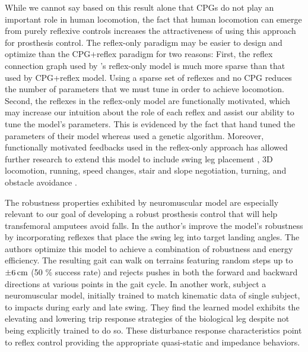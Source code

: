 While we cannot say based on this result alone that CPGs do not play an
important role in human locomotion, the fact that human locomotion can emerge
from purely reflexive controls increases the attractiveness of using this
approach for prosthesis control. The reflex-only paradigm may be easier to
design and optimize than the CPG+reflex paradigm for two reasons: First, the
reflex connection graph used by \citet{geyer2010muscle}'s reflex-only model is
much more sparse than that used by \citet{ogihara2001generation} CPG+reflex
model. Using a sparse set of reflexes and no CPG reduces the number of
parameters that we must tune in order to achieve locomotion. Second, the
reflexes in the reflex-only model are functionally motivated, which may increase
our intuition about the role of each reflex and assist our ability to tune the
model's parameters. This is evidenced by the fact that
\citeauthor{geyer2010muscle} hand tuned the parameters of their model whereas
\citeauthor{ogihara2001generation} used a genetic algorithm.  Moreover,
functionally motivated feedbacks used in the reflex-only approach has allowed
further research to extend this model to include swing leg placement
\citep{desai2013muscle}, 3D locomotion, running, speed changes, stair and slope
negotiation, turning, and obstacle avoidance \citep{song2015neural}.  

The robustness properties exhibited by neuromuscular model are especially
relevant to our goal of developing a robust prosthesis control that will help
transfemoral amputees avoid falls. In \citet{song2015neural} the author's
improve the model's robustness by incorporating reflexes that place the swing
leg into target landing angles. The authors optimize this model to achieve a
combination of robustness and energy efficiency.  The resulting gait can walk on
terrains featuring random steps up to $\unit[\pm 6]{cm}$ (50 \% success rate)
and rejects pushes in both the forward and backward directions at various points
in the gait cycle. In another work, \citet{murai2011neuromuscular} subject a
neuromuscular model, initially trained to match kinematic data of single
subject, to impacts during early and late swing. They find the learned model
exhibits the elevating and lowering trip response strategies of the biological
leg despite not being explicitly trained to do so. These disturbance response
characteristics point to reflex control providing the appropriate quasi-static
and impedance behaviors.

